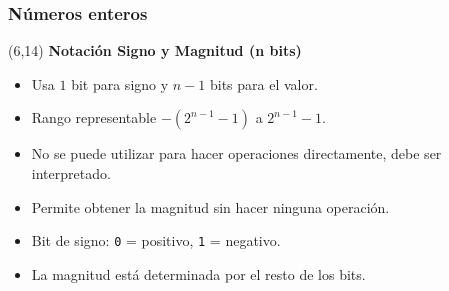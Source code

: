 \documentclass[aspectratio=169]{beamer}
\begin{document}
\begin{frame}[fragile]
    \frametitle{Números enteros}
    \begin{textblock}{90}(6,14)
    \textbf{Notación Signo y Magnitud (n bits)}
    \begin{itemize} \small
    \item Usa $1$ bit para signo y $n-1$ bits para el valor.
    \item Rango representable $-(2^{n-1}-1)$ a $2^{n-1}-1$.
    \item No se puede utilizar para hacer operaciones directamente, debe ser interpretado.
    \item Permite obtener la magnitud sin hacer ninguna operación.
    \item<1-> Bit de signo: \texttt{\textcolor{naranjauca}{0}} = positivo, \texttt{\textcolor{naranjauca}{1}} = negativo.
    \item<1-> La magnitud está determinada por el resto de los bits.
    \end{itemize}
    \vspace{0.2cm}
    \end{textblock}
    

\end{frame}
\end{document}
